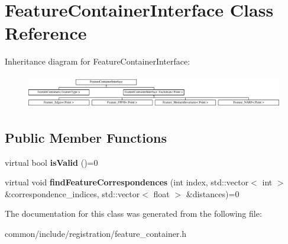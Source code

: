 \hypertarget{classFeatureContainerInterface}{
\section{FeatureContainerInterface Class Reference}
\label{classFeatureContainerInterface}
}
Inheritance diagram for FeatureContainerInterface:\begin{figure}[H]
\begin{center}
\leavevmode
\includegraphics[height=1.478873cm]{classFeatureContainerInterface}
\end{center}
\end{figure}
\subsection*{Public Member Functions}
\begin{DoxyCompactItemize}
\item 
\hypertarget{classFeatureContainerInterface_a9568589d47d1d10cfb86994b0447b929}{
virtual bool {\bfseries isValid} ()=0}
\label{classFeatureContainerInterface_a9568589d47d1d10cfb86994b0447b929}

\item 
\hypertarget{classFeatureContainerInterface_a0f2f617c6a7b3550ede10ff9c119dbaf}{
virtual void {\bfseries findFeatureCorrespondences} (int index, std::vector$<$ int $>$ \&correspondence\_\-indices, std::vector$<$ float $>$ \&distances)=0}
\label{classFeatureContainerInterface_a0f2f617c6a7b3550ede10ff9c119dbaf}

\end{DoxyCompactItemize}


The documentation for this class was generated from the following file:\begin{DoxyCompactItemize}
\item 
common/include/registration/feature\_\-container.h\end{DoxyCompactItemize}
